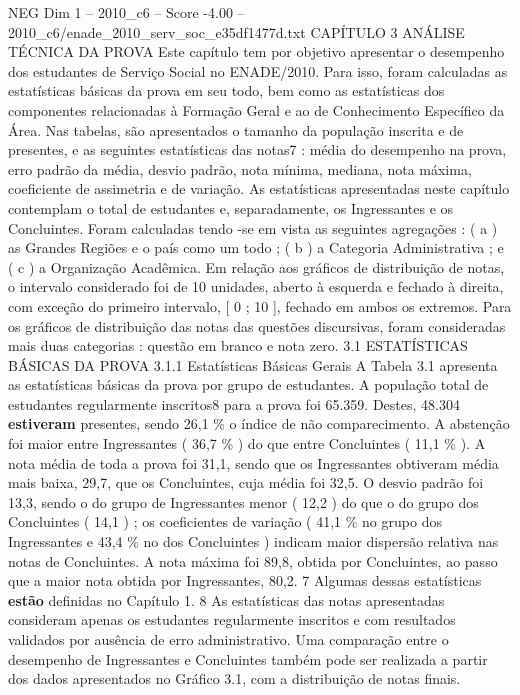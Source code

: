 \begin{textsample}{NEG Dim 1 – 2010\_c6 – Score -4.00 – 2010\_c6/enade\_2010\_serv\_soc\_e35df1477d.txt}  \label{ex:f1_neg_272}
CAPÍTULO 3 ANÁLISE TÉCNICA DA PROVA Este capítulo tem por objetivo apresentar o desempenho dos estudantes de Serviço Social no ENADE/2010.
Para isso, foram calculadas as estatísticas básicas da prova em seu todo, bem como as estatísticas dos componentes relacionadas à Formação Geral e ao de Conhecimento Específico da Área.
Nas tabelas, são apresentados o tamanho da população inscrita e de presentes, e as seguintes estatísticas das notas7 : média do desempenho na prova, erro padrão da média, desvio padrão, nota mínima, mediana, nota máxima, coeficiente de assimetria e de variação.
As estatísticas apresentadas neste capítulo contemplam o total de estudantes e, separadamente, os Ingressantes e os Concluintes.
Foram calculadas tendo -se em vista as seguintes agregações : ( a ) as Grandes Regiões e o país como um todo ; ( b ) a Categoria Administrativa ; e ( c ) a Organização Acadêmica.
Em relação aos gráficos de distribuição de notas, o intervalo considerado foi de 10 unidades, aberto à esquerda e fechado à direita, com exceção do primeiro intervalo, [ 0 ; 10 ], fechado em ambos os extremos.
Para os gráficos de distribuição das notas das questões discursivas, foram consideradas mais duas categorias : questão em branco e nota zero. 3.1 ESTATÍSTICAS BÁSICAS DA PROVA 3.1.1 Estatísticas Básicas Gerais A Tabela 3.1 apresenta as estatísticas básicas da prova por grupo de estudantes.
A população total de estudantes regularmente inscritos8 para a prova foi 65.359.
Destes, 48.304 \textbf{estiveram} presentes, sendo 26,1 \% o índice de não comparecimento.
A abstenção foi maior entre Ingressantes ( 36,7 \% ) do que entre Concluintes ( 11,1 \% ).
A nota média de toda a prova foi 31,1, sendo que os Ingressantes obtiveram média mais baixa, 29,7, que os Concluintes, cuja média foi 32,5.
O desvio padrão foi 13,3, sendo o do grupo de Ingressantes menor ( 12,2 ) do que o do grupo dos Concluintes ( 14,1 ) ; os coeficientes de variação ( 41,1 \% no grupo dos Ingressantes e 43,4 \% no dos Concluintes ) indicam maior dispersão relativa nas notas de Concluintes.
A nota máxima foi 89,8, obtida por Concluintes, ao passo que a maior nota obtida por Ingressantes, 80,2. 7 Algumas dessas estatísticas \textbf{estão} definidas no Capítulo 1. 8 As estatísticas das notas apresentadas consideram apenas os estudantes regularmente inscritos e com resultados validados por ausência de erro administrativo.
Uma comparação entre o desempenho de Ingressantes e Concluintes também pode ser realizada a partir dos dados apresentados no Gráfico 3.1, com a distribuição de notas finais.

\end{textsample}
